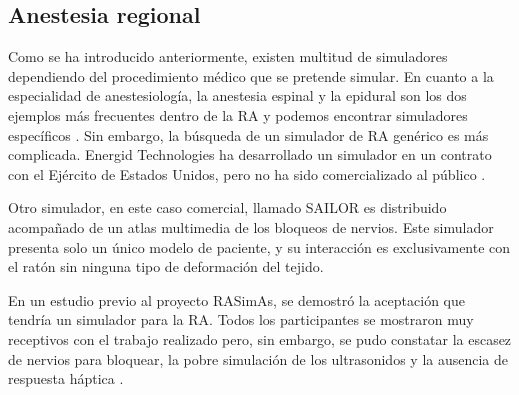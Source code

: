 \subsection{Anestesia regional}

Como se ha introducido anteriormente, existen multitud de simuladores dependiendo del procedimiento médico que se pretende simular. En cuanto a la especialidad de anestesiología, la anestesia espinal y la epidural son los dos ejemplos más frecuentes dentro de la \ac{RA} y podemos encontrar simuladores específicos \cite{broom2018evaluation}. Sin embargo, la búsqueda de un simulador de \ac{RA} genérico es más complicada. Energid Technologies ha desarrollado  un simulador en un contrato con el Ejército de Estados Unidos, pero no ha sido comercializado al público \cite{lim2008simulation}.

Otro simulador, en este caso comercial, llamado SAILOR es distribuido acompañado de un atlas multimedia de los bloqueos de nervios. Este simulador presenta solo un único modelo de paciente, y su interacción es exclusivamente con el ratón sin ninguna tipo de deformación del tejido\cite{Bibin}. 

En un estudio previo al proyecto \ac{RASimAs}, se demostró la aceptación que tendría un simulador para la \ac{RA}. Todos los participantes se mostraron muy receptivos con el trabajo realizado pero, sin embargo, se pudo constatar la escasez de nervios para bloquear, la pobre simulación de los ultrasonidos y la ausencia de respuesta háptica \cite{Grottke2009594}.

